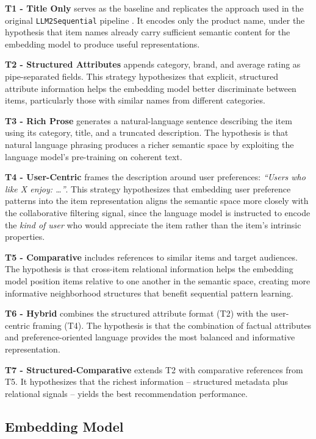 \documentclass[12pt,a4paper]{report}
\begin{document}
\textbf{T1 - Title Only} serves as the baseline and replicates the approach
used in the original \texttt{LLM2Sequential} pipeline
\citep{boz2025}. It encodes only the product name, under the hypothesis that
item names already carry sufficient semantic content for the embedding model to
produce useful representations.

\textbf{T2 - Structured Attributes} appends category, brand, and average rating
as pipe-separated fields. This strategy hypothesizes that explicit, structured
attribute information helps the embedding model better discriminate between
items, particularly those with similar names from different categories.

\textbf{T3 - Rich Prose} generates a natural-language sentence describing the
item using its category, title, and a truncated description. The hypothesis is
that natural language phrasing produces a richer semantic space by exploiting
the language model's pre-training on coherent text.

\textbf{T4 - User-Centric} frames the description around user preferences:
\textit{``Users who like X enjoy: \ldots''}. This strategy hypothesizes that
embedding user preference patterns into the item representation aligns the
semantic space more closely with the collaborative filtering signal, since the
language model is instructed to encode the \emph{kind of user} who would
appreciate the item rather than the item's intrinsic properties.

\textbf{T5 - Comparative} includes references to similar items and target
audiences. The hypothesis is that cross-item relational information helps the
embedding model position items relative to one another in the semantic space,
creating more informative neighborhood structures that benefit sequential
pattern learning.

\textbf{T6 - Hybrid} combines the structured attribute format (T2) with the
user-centric framing (T4). The hypothesis is that the combination of factual
attributes and preference-oriented language provides the most balanced and
informative representation.

\textbf{T7 - Structured-Comparative} extends T2 with comparative references
from T5. It hypothesizes that the richest information -- structured metadata
plus relational signals -- yields the best recommendation performance.

\subsection*{Embedding Model}
\end{document}
